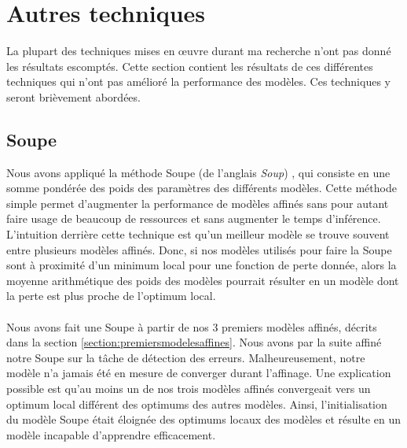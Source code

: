 \documentclass[12pt,twoside,rapport]{dms}
\theoremstyle{definition}
\numberwithin{equation}{section}
\numberwithin{table}{chapter}
\numberwithin{figure}{chapter}
\begin{document}
\chapter{Autres techniques} \label{chapitre:autretechnique}
La plupart des techniques mises en œuvre durant ma recherche n'ont pas donné
les résultats escomptés. Cette section contient les résultats de ces
différentes techniques qui n'ont pas amélioré la performance des modèles. Ces
techniques y seront brièvement abordées.
\section{Soupe}
Nous avons appliqué la méthode Soupe (de l'anglais \textit{Soup}) \cite{soup},
qui consiste en une somme pondérée des poids des paramètres des différents
modèles. Cette méthode simple permet d'augmenter la performance de modèles
affinés sans pour autant faire usage de beaucoup de ressources et sans
augmenter le temps d'inférence. L'intuition derrière cette technique est qu'un
meilleur modèle se trouve souvent entre plusieurs modèles affinés. Donc, si nos
modèles utilisés pour faire la Soupe sont à proximité d'un minimum local pour
une fonction de perte donnée, alors la moyenne arithmétique des poids des
modèles pourrait résulter en un modèle dont la perte est plus proche de
l'optimum local.
\\
\\
Nous avons fait une Soupe à partir de nos 3 premiers modèles affinés, décrits
dans la section \ref{section:premiersmodelesaffines}. Nous avons par la suite
affiné notre Soupe sur la tâche de détection des erreurs. Malheureusement,
notre modèle n'a jamais été en mesure de converger durant l'affinage. Une
explication possible est qu'au moins un de nos trois modèles affinés
convergeait vers un optimum local différent des optimums des autres modèles.
Ainsi, l'initialisation du modèle Soupe était éloignée des optimums locaux des
modèles et résulte en un modèle incapable d'apprendre efficacement.
\end{document}
